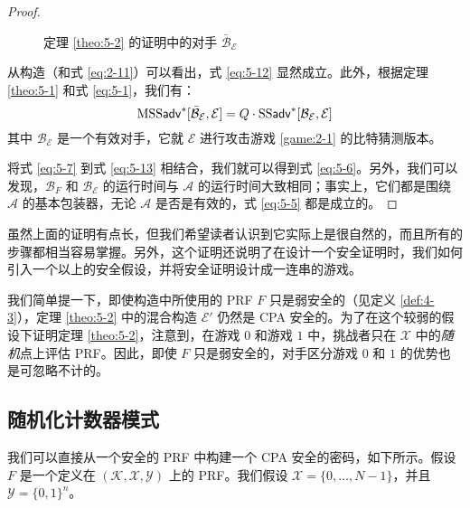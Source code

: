 \begin{proof}
\begin{figure}
  \centering
  
  \caption{定理 \ref{theo:5-2} 的证明中的对手 $\mathcal{\bar{B}}_\mathcal{E}$}
  \label{fig:5-2}
\end{figure}

从构造（和式 \ref{eq:2-11}）可以看出，式 \ref{eq:5-12} 显然成立。此外，根据定理 \ref{theo:5-1} 和式 \ref{eq:5-1}，我们有：
\begin{equation}\label{eq:5-13}
{\rm MSS}\mathsf{adv}^*[\mathcal{\bar{B}}_\mathcal{E}, \mathcal{E}]=Q\cdot{\rm SS}\mathsf{adv}^*[\mathcal{B}_\mathcal{E},\mathcal{E}]
\end{equation}
其中 $\mathcal{B}_\mathcal{E}$ 是一个有效对手，它就 $\mathcal{E}$ 进行攻击游戏 \ref{game:2-1} 的比特猜测版本。

将式 \ref{eq:5-7} 到式 \ref{eq:5-13} 相结合，我们就可以得到式 \ref{eq:5-6}。另外，我们可以发现，$\mathcal{B}_F$ 和 $\mathcal{B}_\mathcal{E}$ 的运行时间与 $\mathcal{A}$ 的运行时间大致相同；事实上，它们都是围绕 $\mathcal{A}$ 的基本包装器，无论 $\mathcal{A}$ 是否是有效的，式 \ref{eq:5-5} 都是成立的。
\end{proof}

虽然上面的证明有点长，但我们希望读者认识到它实际上是很自然的，而且所有的步骤都相当容易掌握。另外，这个证明还说明了在设计一个安全证明时，我们如何引入一个以上的安全假设，并将安全证明设计成一连串的游戏。

\begin{remark}\label{remark:5-2}
我们简单提一下，即使构造中所使用的 PRF $F$ 只是弱安全的（见定义 \ref{def:4-3}），定理 \ref{theo:5-2} 中的混合构造 $\mathcal{E}'$ 仍然是 CPA 安全的。为了在这个较弱的假设下证明定理 \ref{theo:5-2}，注意到，在游戏 $0$ 和游戏 $1$ 中，挑战者只在 $\mathcal{X}$ 中的\emph{随机}点上评估 PRF。因此，即使 $F$ 只是弱安全的，对手区分游戏 $0$ 和 $1$ 的优势也是可忽略不计的。
\end{remark}

\subsection{随机化计数器模式}\label{subsec:5-4-2}

我们可以直接从一个安全的 PRF 中构建一个 CPA 安全的密码，如下所示。假设 $F$ 是一个定义在 $(\mathcal{K},\mathcal{X},\mathcal{Y})$ 上的 PRF。我们假设 $\mathcal{X}=\{0,\dots,N-1\}$，并且 $\mathcal{Y}=\{0,1\}^n$。

